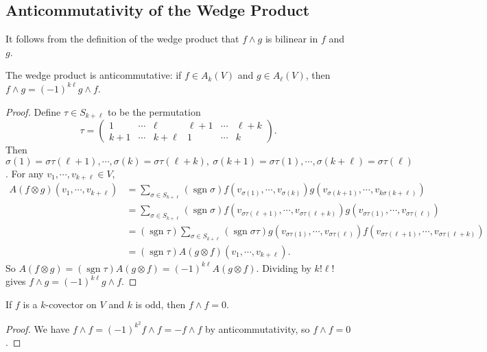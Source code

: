 \subsection{Anticommutativity of the Wedge Product}
It follows from the definition of the wedge product that $f\wedge g$ is bilinear in $f$ and $g$.
\begin{prop}
    The wedge product is anticommutative: if $f\in A_k(V)$ and $g\in A_{\ell}(V)$, then $f\wedge g=(-1)^{k\ell}g\wedge f$.
\end{prop}
\begin{proof}
    Define $\tau \in S_{k+\ell}$ to be the permutation \[
    \tau=
    \begin{pmatrix}
        1 & \cdots  & \ell & \ell+1 & \cdots  & \ell +k\\
        k+1 & \cdots  & k+\ell & 1 & \cdots  & k
    \end{pmatrix}.
\] Then $\sigma(1)=\sigma\tau(\ell+1),\cdots ,\sigma(k)=\sigma\tau(\ell+k),\ \sigma(k+1)=\sigma\tau(1),\cdots ,\sigma(k+\ell)=\sigma\tau(\ell)$. For any $v_1,\cdots ,v_{k+\ell}\in V$,
\begin{align*}
    A(f\otimes g)(v_1,\cdots ,v_{k+\ell})&=\sum _{\sigma \in S_{k+\ell}}(\operatorname{sgn}\sigma)f(v_{\sigma(1)},\cdots ,v_{\sigma(k)})g(v_{\sigma(k+1)},\cdots ,v_{k\sigma(k+\ell)})\\
                                         &= \sum _{\sigma \in S_{k+\ell}}(\operatorname{sgn}\sigma)f (v_{\sigma\tau(\ell+1)},\cdots , v _{\sigma\tau(\ell+k)})g(v_{\sigma\tau(1)},\cdots ,v_{\sigma\tau(\ell)})\\
                                         &=(\operatorname{sgn}\tau) \sum _{\sigma\in S_{k+\ell}}(\operatorname{sgn}\sigma\tau) g (v_{\sigma\tau(1)},\cdots , v_{\sigma\tau(\ell)})f(v_{\sigma\tau(\ell+1)},\cdots ,v_{\sigma\tau(\ell+k)})\\
                                         &=(\operatorname{sgn}\tau)A (g\otimes f)(v_1,\cdots ,v_{k+\ell}).
\end{align*}So $A(f\otimes g)=(\operatorname{sgn}\tau )A(g\otimes f)=(-1)^{k\ell}A(g\otimes f)$. Dividing by $k!\ell!$ gives $f\wedge g=(-1)^{k\ell}g\wedge f$.
\end{proof}
\begin{cor}
    If $f$ is a $k$-covector on $V$ and $k$ is odd, then $f\wedge f=0$. 
\end{cor}
\begin{proof}
    We have $f\wedge f = (-1)^{k^2}f\wedge f=-f \wedge f$ by anticommutativity, so $f\wedge f=0$.
\end{proof}
